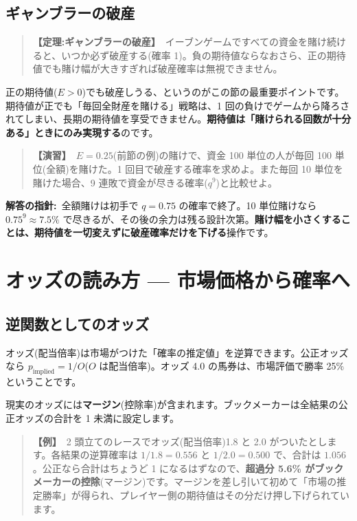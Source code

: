 \documentclass{article}
\begin{document}
\subsection{ギャンブラーの破産}

\begin{quote}
\textbf{【定理:ギャンブラーの破産】}\ イーブンゲームですべての資金を賭け続けると、いつか必ず破産する(確率 1)。負の期待値ならなおさら、正の期待値でも賭け幅が大きすぎれば破産確率は無視できません。
\end{quote}

正の期待値(\(E > 0\))でも破産しうる、というのがこの節の最重要ポイントです。期待値が正でも「毎回全財産を賭ける」戦略は、1 回の負けでゲームから降ろされてしまい、長期の期待値を享受できません。\textbf{期待値は「賭けられる回数が十分ある」ときにのみ実現する}のです。

\begin{quote}
\textbf{【演習】}\ \(E = 0.25\)(前節の例)の賭けで、資金 100 単位の人が毎回 100 単位(全額)を賭けた。1 回目で破産する確率を求めよ。また毎回 10 単位を賭けた場合、9 連敗で資金が尽きる確率(\(q^9\))と比較せよ。
\end{quote}

\textbf{解答の指針:}\ 全額賭けは初手で \(q = 0.75\) の確率で終了。10 単位賭けなら \(0.75^9 \approx 7.5\%\) で尽きるが、その後の余力は残る設計次第。\textbf{賭け幅を小さくすることは、期待値を一切変えずに破産確率だけを下げる}操作です。

\section{オッズの読み方 — 市場価格から確率へ}

\subsection{逆関数としてのオッズ}

オッズ(配当倍率)は市場がつけた「確率の推定値」を逆算できます。公正オッズなら \(p_{\text{implied}} = 1 / O\)(\(O\) は配当倍率)。オッズ 4.0 の馬券は、市場評価で勝率 25\% ということです。

現実のオッズには\textbf{マージン}(控除率)が含まれます。ブックメーカーは全結果の公正オッズの合計を 1 未満に設定します。

\begin{quote}
\textbf{【例】}\ 2 頭立てのレースでオッズ(配当倍率)1.8 と 2.0 がついたとします。各結果の逆算確率は \(1/1.8 = 0.556\) と \(1/2.0 = 0.500\) で、合計は \(1.056\)。公正なら合計はちょうど 1 になるはずなので、\textbf{超過分 5.6\% がブックメーカーの控除}(マージン)です。マージンを差し引いて初めて「市場の推定勝率」が得られ、プレイヤー側の期待値はその分だけ押し下げられています。
\end{quote}
\end{document}

